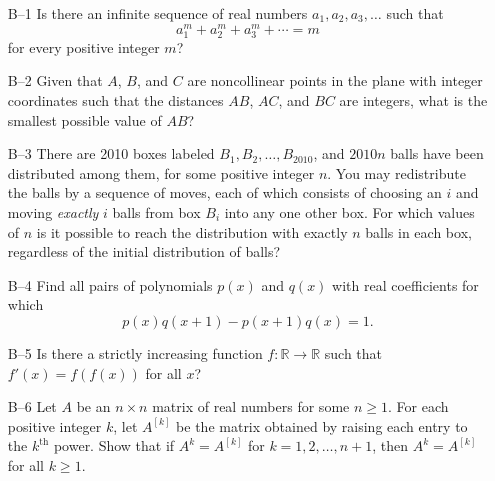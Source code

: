 \documentclass[amssymb,twocolumn,pra,10pt,aps]{revtex4-1}
\begin{document}
\begin{itemize}
\item[B--1]
Is there an infinite sequence of real numbers $a_1, a_2, a_3, \dots$ such that
\[
a_1^m + a_2^m + a_3^m + \cdots = m
\]
for every positive integer $m$?

\item[B--2]
Given that $A$, $B$, and $C$ are noncollinear points in the plane with integer coordinates
such that the distances $AB$, $AC$, and $BC$ are integers, what is the smallest possible value of $AB$?

\item[B--3]
There are 2010 boxes labeled $B_1, B_2, \dots, B_{2010}$, and $2010n$ balls have been distributed
among them, for some positive integer $n$. You may redistribute the balls by a sequence of moves,
each of which consists of choosing an $i$ and moving \emph{exactly} $i$ balls from box $B_i$ into any
one other box. For which values of $n$ is it possible to reach the distribution with exactly $n$ balls
in each box, regardless of the initial distribution of balls?
\medskip

\item[B--4]
Find all pairs of polynomials $p(x)$ and $q(x)$ with real coefficients for which
\[
p(x) q(x+1) - p(x+1) q(x) = 1.
\]

\item[B--5]
Is there a strictly increasing function $f: \mathbb{R} \to \mathbb{R}$ such that $f'(x) = f(f(x))$ for all $x$?

\item[B--6]
Let $A$ be an $n \times n$ matrix of real numbers for some $n \geq 1$.
For each positive integer $k$, let $A^{[k]}$ be the matrix obtained by raising each entry to the $k^{\mathrm{th}}$
power. Show that if $A^k = A^{[k]}$ for $k=1,2,\dots,n+1$, then $A^k = A^{[k]}$ for all $k \geq 1$.

\end{itemize}
\end{document}
